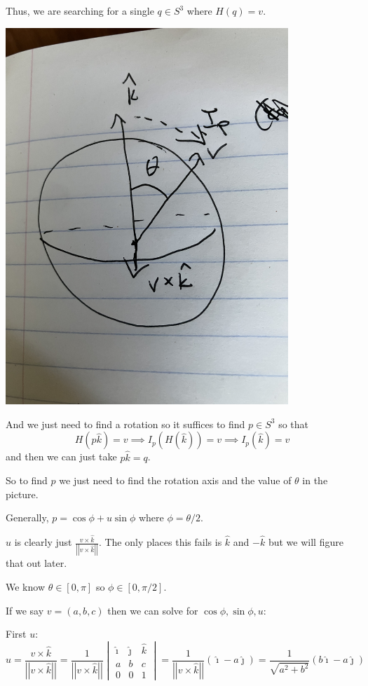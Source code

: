 \documentclass[12pt]{article}
\renewcommand{\hat}[1]{\widehat{#1}}
\newcommand{\norm}[1]{\left\vert \left\vert #1 \right\vert \right\vert}
\newcommand{\ihat}{\hat{\imath}}
\newcommand{\jhat}{\hat{\jmath}}
\newcommand{\khat}{\hat{k}}
\begin{document}
    Thus, we are searching for a single $q \in S^3$ where $H(q) = v$. 

    \begin{center}
        \includegraphics[width=0.8\textwidth,angle=-90,origin=c0]{Images/April 22 - vk ball.png}
    \end{center}

    And we just need to find a rotation so it suffices to find $p \in S^3$ so that 
    \[H(p \khat) = v \implies I_p(H(\khat)) = v \implies I_p(\khat) = v\]
    and then we can just take $p\khat = q$. 

    So to find $p$ we just need to find the rotation axis and the value of $\theta$ in the picture. 

    Generally, $p = \cos \phi + u\sin \phi$ where $\phi = \theta/2$. 

    $u$ is clearly just $\frac{v \times \khat}{\norm{v \times \khat}}$. The only places this fails is $\khat$ and $-\khat$ but we will figure that out later. 

    We know $\theta \in [0, \pi]$ so $\phi \in [0, \pi/2]$. 

    If we say $v = (a, b, c)$ then we can solve for $\cos \phi, \sin \phi, u$: 
    
    First $u$:
    \[u = \frac{ v \times \khat }{\norm{v \times \khat}} = \frac{1}{\norm{v \times \khat}} \begin{vmatrix}
        \ihat & \jhat & \khat\\ 
        a & b & c\\ 
        0 & 0 & 1
    \end{vmatrix} = \frac{1}{\norm{v \times \khat}} (\ihat - a\jhat) = \frac{1}{\sqrt{a^2 + b^2}}(b\ihat - a\jhat)\]
\end{document}
